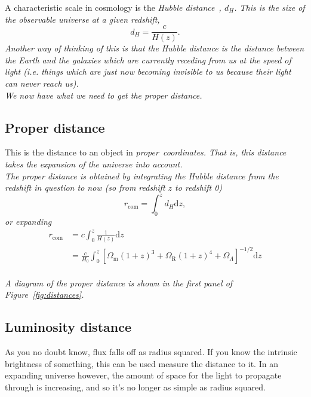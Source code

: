 \documentclass[]{article}
\begin{document}
\noindent A characteristic scale in cosmology is the \itshape Hubble distance~\upshape, $d_H$. This is the size of the observable universe at a given redshift,
\begin{equation}
d_H = \frac{c}{H(z)}.
\end{equation}
Another way of thinking of this is that the Hubble distance is the distance between the Earth and the galaxies which are currently receding from us at the speed of light (i.e. things which are just now becoming invisible to us because their light can never reach us). \\

\noindent We now have what we need to get the proper distance.

\subsection{Proper distance}

This is the distance to an object in \itshape proper~\upshape coordinates. That is, this distance takes the expansion of the universe into account. \\

\noindent The proper distance is obtained by integrating the Hubble distance from the redshift in question to now (so from redshift $z$ to redshift 0)
\begin{equation}
r_\mathrm{com} = \int_0^z d_H \mathrm{d}z,
\end{equation}
or expanding
\begin{equation}
\boxed{
\begin{split}
r_\mathrm{com} &= c\int_0^z \frac{1}{H(z)}\mathrm{d}z\\
&= \frac{c}{H_0}\int_0^z [\Omega_\mathrm{m} (1+z)^{3}+\Omega_\mathrm{R} (1+z)^{4}+\Omega_\Lambda]^{-1/2}\mathrm{d}z
\end{split}
}
\end{equation}\\

\noindent A diagram of the proper distance is shown in the first panel of Figure~\ref{fig:distances}.

\subsection{Luminosity distance}

As you no doubt know, flux falls off as radius squared. If you know the intrinsic brightness of something, this can be used measure the distance to it. In an expanding universe however, the amount of space for the light to propagate through is increasing, and so it’s no longer as simple as radius squared. \\
\end{document}
